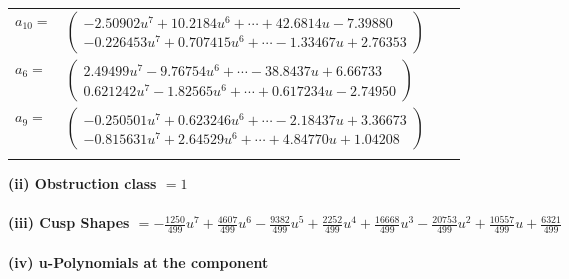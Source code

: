 \documentclass[1p]{elsarticle_modified}
\theoremstyle{definition}
\begin{document}
\begin{tabular}{m{7pt} m{180pt} m{7pt} m{180pt} }
\flushright $a_{10}=$&$\begin{pmatrix}-2.50902 u^{7}+10.2184 u^{6}+\cdots+42.6814 u-7.39880\\-0.226453 u^{7}+0.707415 u^{6}+\cdots-1.33467 u+2.76353\end{pmatrix}$ \\
\flushright $a_{6}=$&$\begin{pmatrix}2.49499 u^{7}-9.76754 u^{6}+\cdots-38.8437 u+6.66733\\0.621242 u^{7}-1.82565 u^{6}+\cdots+0.617234 u-2.74950\end{pmatrix}$ \\
\flushright $a_{9}=$&$\begin{pmatrix}-0.250501 u^{7}+0.623246 u^{6}+\cdots-2.18437 u+3.36673\\-0.815631 u^{7}+2.64529 u^{6}+\cdots+4.84770 u+1.04208\end{pmatrix}$\\&\end{tabular}
\flushleft \textbf{(ii) Obstruction class $= 1$}\\~\\
\flushleft \textbf{(iii) Cusp Shapes $= -\frac{1250}{499} u^7+\frac{4607}{499} u^6-\frac{9382}{499} u^5+\frac{2252}{499} u^4+\frac{16668}{499} u^3-\frac{20753}{499} u^2+\frac{10557}{499} u+\frac{6321}{499}$}\\~\\
\newpage\renewcommand{\arraystretch}{1}
\flushleft \textbf{(iv) u-Polynomials at the component}\newline \\
\end{document}
